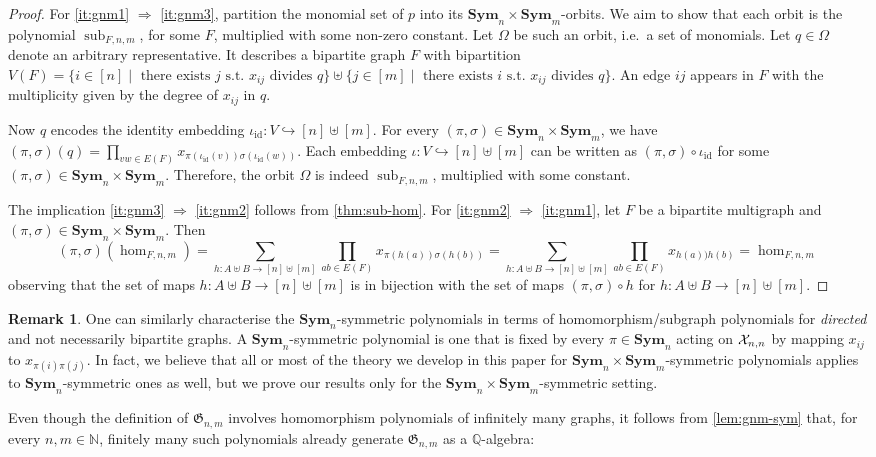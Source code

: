 \documentclass[11pt, DIV=15]{scrarticle}
\theoremstyle{definition}
\newtheorem{remark}[definition]{Remark}
\theoremstyle{plain}
\theoremstyle{remark}
\newcommand{\Xx}{{\cal X}}
\DeclareMathOperator{\sub}{sub}
\DeclareMathOperator{\id}{id}
\newcommand{\Sym}{\mathbf{Sym}}
\begin{document}
	\symmetricPolynomials*
	\begin{proof}
		For \ref{it:gnm1} $\Rightarrow$ \ref{it:gnm3},
		partition the monomial set of $p$ into its $\Sym_n \times \Sym_m$-orbits. 
		We aim to show that each orbit is the polynomial $\sub_{F,n,m}$, for some $F$, multiplied with some non-zero constant. 
		Let $\Omega$ be such an orbit, i.e.\ a set of monomials. 
		Let $q \in \Omega$ denote an arbitrary representative. 
		It describes a bipartite graph $F$ with bipartition $V(F) = \{ i \in [n] \mid \text{ there exists } j \text{ s.t. } x_{ij} \text{ divides } q \}  \allowbreak  \uplus \allowbreak \{ j \in [m] \mid \text{ there exists } i \text{ s.t. } x_{ij} \text{ divides } q \}$.
		An edge $ij$ appears in $F$ with the multiplicity given by the degree of $x_{ij}$ in $q$.
		
		Now $q$ encodes the identity embedding $\iota_{\id} \colon V \hookrightarrow [n] \uplus [m]$. 
		For every $(\pi,\sigma) \in \Sym_n \times \Sym_m$, 
		we have $(\pi, \sigma)(q) = \prod_{vw \in E(F)} x_{\pi(\iota_{\id}(v))\sigma(\iota_{\id}(w))}$. 
		Each embedding $\iota \colon V \hookrightarrow [n] \uplus [m]$ can be written as $(\pi,\sigma) \circ \iota_{\id}$ for some $(\pi,\sigma) \in \Sym_n \times \Sym_m$. 
		Therefore, the orbit $\Omega$ is indeed $\sub_{F,n,m}$, multiplied with some constant.
		
		The implication \ref{it:gnm3} $\Rightarrow$ \ref{it:gnm2} follows from \cref{thm:sub-hom}.
		For \ref{it:gnm2} $\Rightarrow$ \ref{it:gnm1}, let $F$ be a bipartite multigraph and $(\pi, \sigma) \in \Sym_n \times \Sym_m$.
		Then
		\[
			(\pi,\sigma)(\hom_{F, n, m}) = \sum_{h \colon A \uplus B \to [n] \uplus [m]} \prod_{ab \in E(F)} x_{\pi(h(a)) \sigma(h(b))}
			= \sum_{h \colon A \uplus B \to [n] \uplus [m]} \prod_{ab \in E(F)} x_{h(a)) h(b)} = \hom_{F, n,m}
		\]
		observing that the set of maps $h \colon A \uplus B \to [n] \uplus [m]$ is in bijection with the set of maps $(\pi, \sigma) \circ h$ for $h \colon A \uplus B \to [n] \uplus [m]$.
	\end{proof}
	\begin{remark} 
		\label{rem:squareSymmetricPolynomials}
	One can similarly characterise the $\Sym_n$-symmetric polynomials in terms of homomorphism/subgraph polynomials for \emph{directed} and not necessarily bipartite graphs. A $\Sym_n$-symmetric polynomial is one that is fixed by every $\pi \in \Sym_n$ acting on $\Xx_{n,n}$ by mapping $x_{ij}$ to $x_{\pi(i)\pi(j)}$. In fact, we believe that all or most of the theory we develop in this paper for $\Sym_n \times \Sym_m$-symmetric polynomials applies to $\Sym_n$-symmetric ones as well, but we prove our results only for the $\Sym_n \times \Sym_m$-symmetric setting.
	\end{remark}	
	Even though the definition of $\mathfrak{G}_{n,m}$ involves homomorphism polynomials of infinitely many graphs,
	it follows from \cref{lem:gnm-sym} that, for every $n,m\in \mathbb{N}$, finitely many such polynomials already generate $\mathfrak{G}_{n,m}$ as a $\mathbb{Q}$-algebra:
	
\end{document}
